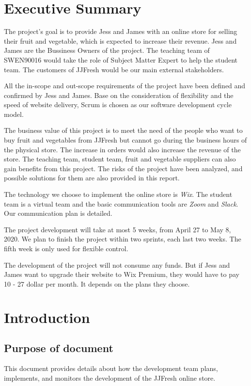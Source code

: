 \documentclass{report}
\begin{document}
\chapter*{Executive Summary}
  The project's goal is to provide Jess and James with an online store for selling their fruit and vegetable, which is expected to increase their revenue. Jess and James are the Bussiness Owners of the project. The teaching team of SWEN90016 would take the role of Subject Matter Expert to help the student team. The customers of JJFresh would be our main external stakeholders.

  All the in-scope and out-scope requirements of the project have been defined and confirmed by Jess and James. Base on the consideration of flexibility and the speed of website delivery, Scrum is chosen as our software development cycle model.

  The business value of this project is to meet the need of the people who want to buy fruit and vegetables from JJFresh but cannot go during the business hours of the physical store. The increase in orders would also increase the revenue of the store. The teaching team, student team, fruit and vegetable suppliers can also gain benefits from this project. The risks of the project have been analyzed, and possible solutions for them are also provided in this report. 

  The technology we choose to implement the online store is \textit{Wix}. The student team is a virtual team and the basic communication tools are \textit{Zoom} and \textit{Slack}. Our communication plan is detailed.

  The project development will take at most 5 weeks, from April 27 to May 8, 2020. We plan to finish the project within two sprints, each last two weeks. The fifth week is only used for flexible control. 

  The development of the project will not consume any funds. But if Jess and James want to upgrade their website to Wix Premium, they would have to pay 10 - 27 dollar per month. It depends on the plans they choose. 

\pagebreak
\clearpage

\tableofcontents
\pagebreak
\chapter{Introduction}
\label{chap:intro}
\section{Purpose of document}
   This document provides details about how the development team plans, implements, and monitors the development of the JJFresh online store. 
\end{document}
